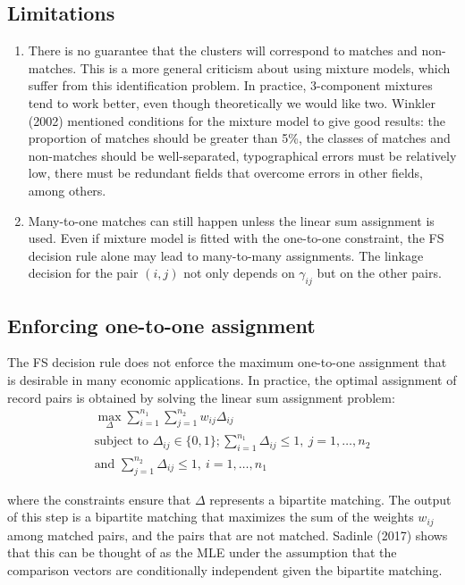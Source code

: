 \documentclass[11pt,reqno]{amsart}
\begin{document}
\subsection{Limitations}
\begin{enumerate}
\item There is no guarantee that the clusters will correspond to matches and non-matches.  This is a more general criticism about using mixture models, which suffer from this identification problem.  In practice, 3-component mixtures tend to work better, even though theoretically we would like two.  Winkler (2002) mentioned conditions for the mixture model to give good results: the proportion of matches should be greater than 5\%, the classes of matches and non-matches should be well-separated, typographical errors must be relatively low, there must be redundant fields that overcome errors in other fields, among others. 
\item Many-to-one matches can still happen unless the linear sum assignment is used.  Even if mixture model is fitted with the one-to-one constraint, the FS decision rule alone may lead to many-to-many assignments.  The linkage decision for the pair $(i,j)$ not only depends on $\gamma_{ij}$ but on the other pairs. 
\end{enumerate}

\subsection{Enforcing one-to-one assignment}

The FS decision rule does not enforce the maximum one-to-one assignment that is desirable in many economic applications.  In practice, the optimal assignment of record pairs is obtained by solving the linear sum assignment problem: 
\begin{gather*}
\max_{\Delta} \sum_{i=1}^{n_1}\sum_{j=1}^{n_2} w_{ij} \Delta_{ij}\\
\text{subject to } \Delta_{ij} \in \{0,1\}; \sum_{i=1}^{n_1} \Delta_{ij} \leq 1, \ j=1, \dots, n_2 \\ \text{and } \sum_{j=1}^{n_2} \Delta_{ij} \leq 1, \ i=1, \dots, n_1 
\end{gather*} 

where the constraints ensure that $\Delta$ represents a bipartite matching.  The output of this step is a bipartite matching that maximizes the sum of the weights $w_{ij}$ among matched pairs, and the pairs that are not matched.  Sadinle (2017) shows that this can be thought of as the MLE under the assumption that the comparison vectors are conditionally independent given the bipartite matching. %
\end{document}
